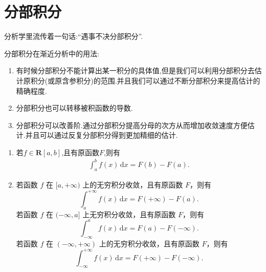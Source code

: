 \documentclass[../../main.tex]{subfiles}
\begin{document}
\section{分部积分}

分析学里流传着一句话:“遇事不决分部积分”.

分部积分在渐近分析中的用法:
\begin{enumerate}[(1)]
\item\label{分部积分在渐近分析中的用法(1)} 有时候分部积分不能计算出某一积分的具体值,但是我们可以利用分部积分去估计原积分(或原含参积分)的范围.并且我们可以通过不断分部积分来提高估计的精确程度.

\item\label{分部积分在渐近分析中的用法(2)} 分部积分也可以转移被积函数的导数.

\item\label{分部积分在渐近分析中的用法(3)} 分部积分可以改善阶.通过分部积分提高分母的次方从而增加收敛速度方便估计.并且可以通过反复分部积分得到更加精细的估计.
\end{enumerate}

\begin{theorem}\label{theorem:Newton-Leibniz公式}
\begin{enumerate}
\item 若$f\in \mathbf{R}[a,b]$,且有原函数$F$,则有
\begin{align*}
\int_a^b{f\left( x \right) \,\mathrm{d}x}=F\left( b \right) -F\left( a \right) .
\end{align*}

\item 若函数 \( f \) 在 \([a, +\infty)\) 上的无穷积分收敛，且有原函数 \( F \)，则有
\[
\int_a^{+\infty} f(x) \, \mathrm{d}x = F(+\infty) - F(a).
\]
若函数 \( f \) 在 \((-\infty, a]\) 上无穷积分收敛，且有原函数 \( F \)，则有
\[
\int_{-\infty}^a f(x) \, \mathrm{d}x = F(a) - F(-\infty).
\]
若函数 \( f \) 在 \((-\infty, +\infty)\) 上的无穷积分收敛，且有原函数 \( F \)，则有
\[
\int_{-\infty}^{+\infty} f(x) \, \mathrm{d}x = F(+\infty) - F(-\infty).
\]
\end{enumerate}
\end{theorem}
\end{document}

